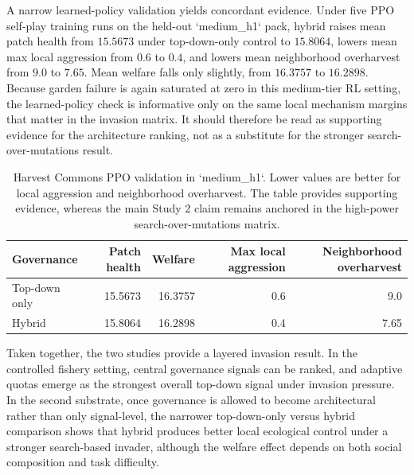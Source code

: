 A narrow learned-policy validation yields concordant evidence. Under five PPO self-play training runs on the held-out `medium\_h1` pack, hybrid raises mean patch health from \(15.5673\) under top-down-only control to \(15.8064\), lowers mean max local aggression from \(0.6\) to \(0.4\), and lowers mean neighborhood overharvest from \(9.0\) to \(7.65\). Mean welfare falls only slightly, from \(16.3757\) to \(16.2898\). Because garden failure is again saturated at zero in this medium-tier RL setting, the learned-policy check is informative only on the same local mechanism margins that matter in the invasion matrix. It should therefore be read as supporting evidence for the architecture ranking, not as a substitute for the stronger search-over-mutations result.

\begin{table}[H]
  \centering
  \captionsetup{font=small}
  \caption{Harvest Commons PPO validation in `medium\_h1`. Lower values are better for local aggression and neighborhood overharvest. The table provides supporting evidence, whereas the main Study 2 claim remains anchored in the high-power search-over-mutations matrix.}
  \label{tab:study2_rl}
  \small
  \begin{tabular}{lrrrr}
    \toprule
    Governance & Patch health & Welfare & Max local aggression & Neighborhood overharvest \\
    \midrule
    Top-down only & 15.5673 & 16.3757 & 0.6 & 9.0 \\
    Hybrid & 15.8064 & 16.2898 & 0.4 & 7.65 \\
    \bottomrule
  \end{tabular}
\end{table}

Taken together, the two studies provide a layered invasion result. In the controlled fishery setting, central governance signals can be ranked, and adaptive quotas emerge as the strongest overall top-down signal under invasion pressure. In the second substrate, once governance is allowed to become architectural rather than only signal-level, the narrower top-down-only versus hybrid comparison shows that hybrid produces better local ecological control under a stronger search-based invader, although the welfare effect depends on both social composition and task difficulty.

